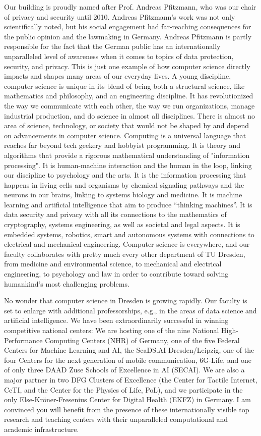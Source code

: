 {Our building is proudly named after Prof. Andreas Pfitzmann, who was our chair of privacy and security until 2010. Andreas Pfitzmann's work was not only scientifically noted, but his social engagement had far-reaching consequences for the public opinion and the lawmaking in Germany. Andreas Pfitzmann is partly responsible for the fact that the German public has an internationally unparalleled level of awareness when it comes to topics of data protection, security, and privacy.  This is just one example of how computer science directly impacts and shapes many areas of our everyday lives. A young discipline, computer science is unique in its blend of being both a structural science, like mathematics and philosophy, and an engineering discipline. It has revolutionized the way we communicate with each other, the way we run organizations, manage industrial production, and do science in almost all disciplines. There is almost no area of science, technology, or society that would not be shaped by and depend on advancements in computer science. Computing is a universal language that reaches far beyond tech geekery and hobbyist programming. It is theory and algorithms that provide a rigorous mathematical understanding of "information processing". It is human-machine interaction and the human in the loop, linking our discipline to psychology and the arts. It is the information processing that happens in living cells and organisms by chemical signaling pathways and the neurons in our brains, linking to systems biology and medicine. It is machine learning and artificial intelligence that aim to produce \enquote{thinking machines}. It is data security and privacy with all its connections to the mathematics of cryptography, systems engineering, as well as societal and legal aspects. It is embedded systems, robotics, smart and autonomous systems with connections to electrical and mechanical engineering. Computer science is everywhere, and our faculty collaborates with pretty much every other department of TU Dresden, from medicine and environmental science, to mechanical and electrical engineering, to psychology and law in order to contribute toward solving humankind’s most challenging problems.

No wonder that computer science in Dresden is growing rapidly. Our faculty is set to enlarge with additional professorships, e.g., in the areas of data science and artificial intelligence. We have been extraordinarily successful in winning competitive national centers: We are hosting one of the nine National High-Performance Computing Centers (NHR) of Germany, one of the five Federal Centers for Machine Learning and AI, the ScaDS.AI Dresden/Leipzig, one of the four Centers for the next generation of mobile communication, 6G-Life, and one of only three DAAD Zuse Schools of Excellence in AI (SECAI). We are also a major partner in two DFG Clusters of Excellence (the Center for Tactile Internet, CeTI, and the Center for the Physics of Life, PoL), and we participate in the only Else-Kröner-Fresenius Center for Digital Health (EKFZ) in Germany. I am convinced you will benefit from the presence of these internationally visible top research and teaching centers with their unparalleled computational and academic infrastructure. 

}
